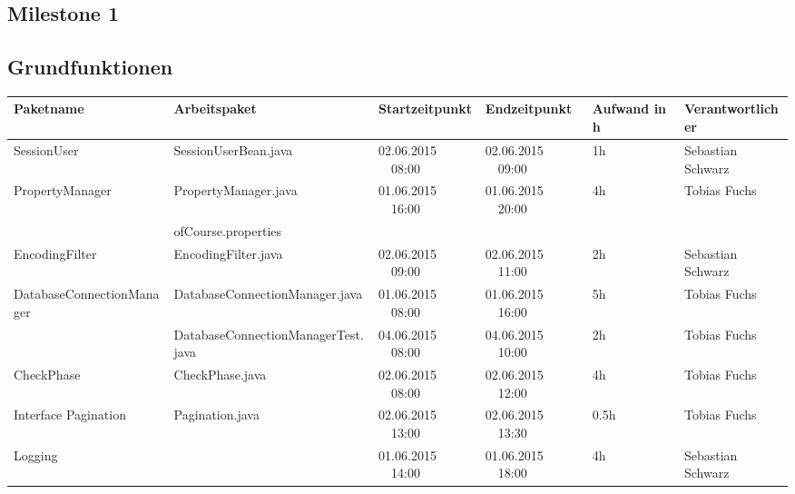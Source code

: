 \begin{landscape}
\section{Milestone 1}

\subsection{Grundfunktionen}
\begin{tabular}{|p{5.2cm} |p{7cm}|p{3.2cm}|p{3.2cm}|p{2cm}|p{3.5cm}|}
	\hline \textbf{Paketname} & \textbf{Arbeitspaket} & \textbf{Startzeitpunkt} & \textbf{Endzeitpunkt} & \textbf{Aufwand in h} & \textbf{Verantwortlicher} \\ 
	\hline  SessionUser          & SessionUserBean.java                     & 02.06.2015 \ \ 08:00        & 02.06.2015 \ \ 09:00        &  1h                 & Sebastian Schwarz\\ 
	\hline  PropertyManager      & PropertyManager.java                     & 01.06.2015 \ \ 16:00        & 01.06.2015 \ \ 20:00        &  4h                 & Tobias Fuchs\\ 
	& ofCourse.properties                      &                            &                              &                                                  &\\
	\hline  EncodingFilter       & EncodingFilter.java                      & 02.06.2015 \ \ 09:00         & 02.06.2015  \ \  11:00      &  2h                & Sebastian Schwarz\\ 
	\hline  DatabaseConnectionManager       &  DatabaseConnectionManager.java & 01.06.2015 \ \ 08:00       & 01.06.2015  \ \  16:00      &  5h                & Tobias Fuchs\\   
	&  DatabaseConnectionManagerTest.java & 04.06.2015 \ \ 08:00       & 04.06.2015  \ \  10:00      &  2h                & Tobias Fuchs\\   
	\hline  CheckPhase           & CheckPhase.java                            & 02.06.2015 \ \ 08:00       & 02.06.2015  \ \  12:00      &  4h                & Tobias Fuchs\\
	\hline  Interface Pagination & Pagination.java                            & 02.06.2015 \ \ 13:00       & 02.06.2015  \ \  13:30      &  0.5h              & Tobias Fuchs\\
	\hline  Logging              &                                            & 01.06.2015 \ \ 14:00       & 01.06.2015  \ \  18:00      &  4h                & Sebastian Schwarz\\ 

\end{tabular}
\end{landscape}
